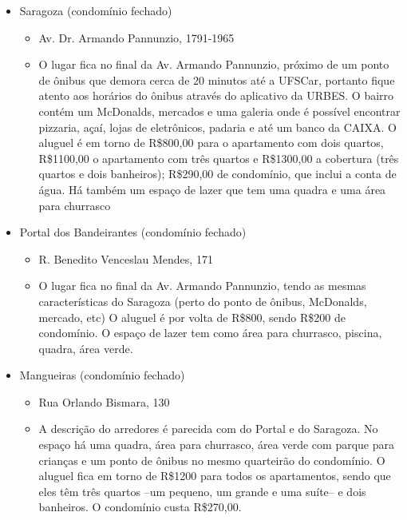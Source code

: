 \begin{itemize}
  \item Saragoza (condomínio fechado)
    \begin{itemize}
      \item Av. Dr. Armando Pannunzio, 1791-1965
      \item{O lugar fica no final da Av. Armando Pannunzio, próximo de um ponto de ônibus que demora cerca de 20 minutos até a UFSCar, portanto fique atento aos horários do ônibus através do aplicativo da URBES. O bairro contém um McDonalds, mercados e uma galeria onde é possível encontrar pizzaria, açaí, lojas de eletrônicos, padaria e até um banco da CAIXA.
	      O aluguel é em torno de R\$800,00 para o apartamento com dois quartos, R\$1100,00 o apartamento com três quartos e R\$1300,00 a cobertura (três quartos e dois banheiros); R\$290,00 de condomínio, que inclui a conta de água. Há também um espaço de lazer que tem uma quadra e uma área para churrasco}
    \end{itemize}

  \item Portal dos Bandeirantes (condomínio fechado)
    \begin{itemize}
      \item R. Benedito Venceslau Mendes, 171
      \item O lugar fica no final da Av. Armando Pannunzio, tendo as mesmas características do Saragoza (perto do ponto de ônibus, McDonalds, mercado, etc) O aluguel é por volta de R\$800, sendo R\$200 de condomínio. O espaço de lazer tem como área para churrasco, piscina, quadra, área verde.
    \end{itemize}

  \item Mangueiras (condomínio fechado)
    \begin{itemize}
      \item Rua Orlando Bismara, 130
      \item A descrição do arredores é parecida com do Portal e do Saragoza. No espaço há uma quadra, área para churrasco, área verde com parque para crianças e um ponto de ônibus no mesmo quarteirão do condomínio. O aluguel fica em torno de R\$1200 para todos os apartamentos, sendo que eles têm três quartos --um pequeno, um grande e uma suíte-- e dois banheiros. O condomínio custa R\$270,00.
    \end{itemize}


\end{itemize}
